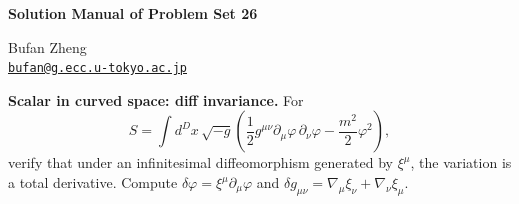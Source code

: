 \resetproblem
\begin{center}
    {\LARGE \textbf{Solution Manual of Problem Set 26} \par}
    \vspace{1em}
    {\large Bufan Zheng\\ \href{mailto:bufan@g.ecc.u-tokyo.ac.jp}{\texttt{bufan@g.ecc.u-tokyo.ac.jp}} \par}
\end{center}

\begin{problem}
    \textbf{Scalar in curved space: diff invariance.} For
    \[
        S=\int d^Dx\,\sqrt{-g}\left(\frac{1}{2}g^{\mu\nu}\partial_\mu\varphi\,\partial_\nu\varphi-\frac{m^2}{2}\varphi^2\right),
    \]
    verify that under an infinitesimal diffeomorphism generated by \(\xi^\mu\), the variation is a total derivative. Compute \(\delta\varphi=\xi^\mu\partial_\mu\varphi\) and \(\delta g_{\mu\nu}=\nabla_\mu\xi_\nu+\nabla_\nu\xi_\mu\).
\end{problem}
